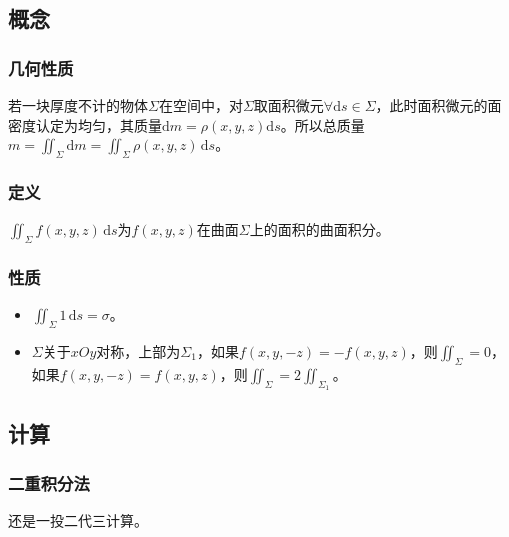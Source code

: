 \documentclass[UTF8, 12pt]{ctexart}
\begin{document}
\subsection{概念}

\subsubsection{几何性质}

若一块厚度不计的物体$\Sigma$在空间中，对$\Sigma$取面积微元$\forall\textrm{d}s\in\Sigma$，此时面积微元的面密度认定为均匀，其质量$\textrm{d}m=\rho(x,y,z)\textrm{d}s$。所以总质量$m=\iint_\Sigma\textrm{d}m=\iint_\Sigma\rho(x,y,z)\,\textrm{d}s$。

\subsubsection{定义}

$\iint_\Sigma f(x,y,z)\,\textrm{d}s$为$f(x,y,z)$在曲面$\Sigma$上的面积的曲面积分。

\subsubsection{性质}

\begin{itemize}
    \item $\iint_\Sigma1\,\textrm{d}s=\sigma$。
    \item $\Sigma$关于$xOy$对称，上部为$\Sigma_1$，如果$f(x,y,-z)=-f(x,y,z)$，则$\iint_\Sigma=0$，如果$f(x,y,-z)=f(x,y,z)$，则$\iint_\Sigma=2\iint_{\Sigma_1}$。
\end{itemize}

\subsection{计算}

\subsubsection{二重积分法}

还是一投二代三计算。
\end{document}
